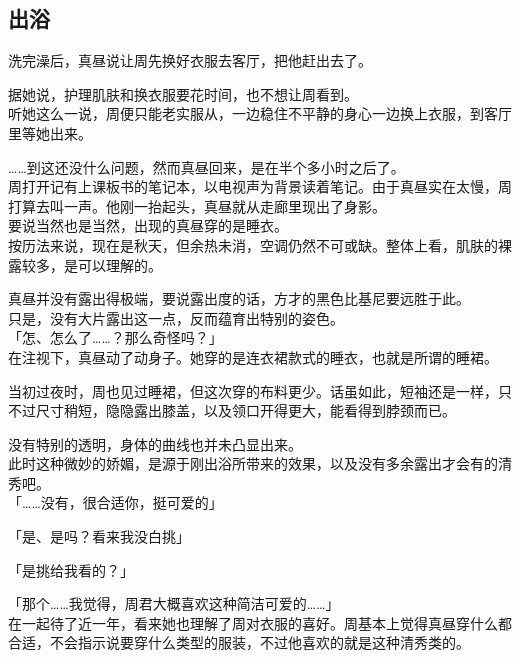 \subsection{出浴}

洗完澡后，真昼说让周先换好衣服去客厅，把他赶出去了。

据她说，护理肌肤和换衣服要花时间，也不想让周看到。\\

听她这么一说，周便只能老实服从，一边稳住不平静的身心一边换上衣服，到客厅里等她出来。

……到这还没什么问题，然而真昼回来，是在半个多小时之后了。\\

周打开记有上课板书的笔记本，以电视声为背景读着笔记。由于真昼实在太慢，周打算去叫一声。他刚一抬起头，真昼就从走廊里现出了身影。\\

要说当然也是当然，出现的真昼穿的是睡衣。\\

按历法来说，现在是秋天，但余热未消，空调仍然不可或缺。整体上看，肌肤的裸露较多，是可以理解的。

真昼并没有露出得极端，要说露出度的话，方才的黑色比基尼要远胜于此。\\

只是，没有大片露出这一点，反而蕴育出特别的姿色。\\

「怎、怎么了……？那么奇怪吗？」\\

在注视下，真昼动了动身子。她穿的是连衣裙款式的睡衣，也就是所谓的睡裙。

当初过夜时，周也见过睡裙，但这次穿的布料更少。话虽如此，短袖还是一样，只不过尺寸稍短，隐隐露出膝盖，以及领口开得更大，能看得到脖颈而已。

没有特别的透明，身体的曲线也并未凸显出来。\\

此时这种微妙的娇媚，是源于刚出浴所带来的效果，以及没有多余露出才会有的清秀吧。\\

「……没有，很合适你，挺可爱的」

「是、是吗？看来我没白挑」

「是挑给我看的？」

「那个……我觉得，周君大概喜欢这种简洁可爱的……」\\

在一起待了近一年，看来她也理解了周对衣服的喜好。周基本上觉得真昼穿什么都合适，不会指示说要穿什么类型的服装，不过他喜欢的就是这种清秀类的。

